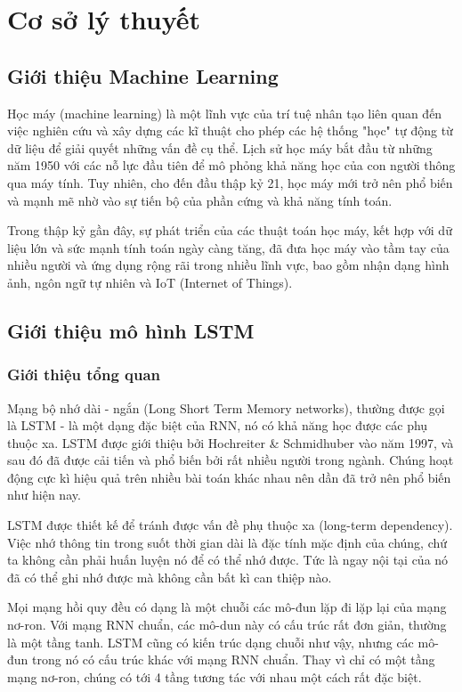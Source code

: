 \section{Cơ sở lý thuyết}


\subsection{Giới thiệu Machine Learning}

\indent Học máy (machine learning) là một lĩnh vực của trí tuệ nhân tạo liên quan đến việc nghiên cứu và xây dựng các kĩ thuật cho phép các hệ thống "học" tự động từ dữ liệu để giải quyết những vấn đề cụ thể. Lịch sử học máy bắt đầu từ những năm 1950 với các nỗ lực đầu tiên để mô phỏng khả năng học của con người thông qua máy tính. Tuy nhiên, cho đến đầu thập kỷ 21, học máy mới trở nên phổ biến và mạnh mẽ nhờ vào sự tiến bộ của phần cứng và khả năng tính toán.

\indent Trong thập kỷ gần đây, sự phát triển của các thuật toán học máy, kết hợp với dữ liệu lớn và sức mạnh tính toán ngày càng tăng, đã đưa học máy vào tầm tay của nhiều người và ứng dụng rộng rãi trong nhiều lĩnh vực, bao gồm nhận dạng hình ảnh, ngôn ngữ tự nhiên và IoT (Internet of Things).

\subsection{Giới thiệu mô hình LSTM}

\subsubsection{Giới thiệu tổng quan}

\indent Mạng bộ nhớ dài - ngắn (Long Short Term Memory networks), thường được gọi là LSTM - là một dạng đặc biệt của RNN, nó có khả năng học được các phụ thuộc xa. LSTM được giới thiệu bởi Hochreiter \& Schmidhuber vào năm 1997, và sau đó đã được cải tiến và phổ biến bởi rất nhiều người trong ngành. Chúng hoạt động cực kì hiệu quả trên nhiều bài toán khác nhau nên dần đã trở nên phổ biến như hiện nay.

\indent LSTM được thiết kế để tránh được vấn đề phụ thuộc xa (long-term dependency). Việc nhớ thông tin trong suốt thời gian dài là đặc tính mặc định của chúng, chứ ta không cần phải huấn luyện nó để có thể nhớ được. Tức là ngay nội tại của nó đã có thể ghi nhớ được mà không cần bất kì can thiệp nào.

\indent Mọi mạng hồi quy đều có dạng là một chuỗi các mô-đun lặp đi lặp lại của mạng nơ-ron. Với mạng RNN chuẩn, các mô-dun này có cấu trúc rất đơn giản, thường là một tầng tanh. LSTM cũng có kiến trúc dạng chuỗi như vậy, nhưng các mô-đun trong nó có cấu trúc khác với mạng RNN chuẩn. Thay vì chỉ có một tầng mạng nơ-ron, chúng có tới 4 tầng tương tác với nhau một cách rất đặc biệt.

